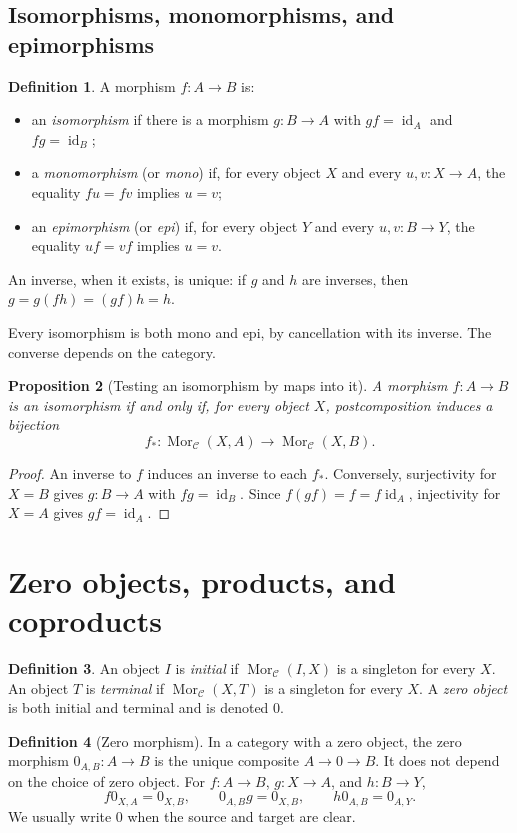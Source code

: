 \documentclass[11pt]{article}
\theoremstyle{definition}
\newtheorem{definition}{Definition}[section]
\theoremstyle{plain}
\newtheorem{proposition}[definition]{Proposition}
\newcommand{\C}{\mathcal C}
\newcommand{\Mor}{\operatorname{Mor}}
\newcommand{\id}{\operatorname{id}}
\begin{document}
\subsection*{Isomorphisms, monomorphisms, and epimorphisms}
\begin{definition}
A morphism $f\colon A\to B$ is:
\begin{itemize}
\item an \emph{isomorphism} if there is a morphism $g\colon B\to A$ with $gf=\id_A$ and $fg=\id_B$;
\item a \emph{monomorphism} (or \emph{mono}) if, for every object $X$ and every $u,v\colon X\to A$, the equality $fu=fv$ implies $u=v$;
\item an \emph{epimorphism} (or \emph{epi}) if, for every object $Y$ and every $u,v\colon B\to Y$, the equality $uf=vf$ implies $u=v$.
\end{itemize}
An inverse, when it exists, is unique: if $g$ and $h$ are inverses, then $g=g(fh)=(gf)h=h$.
\end{definition}
Every isomorphism is both mono and epi, by cancellation with its inverse. The converse depends on the category.

\begin{proposition}[Testing an isomorphism by maps into it]
A morphism $f\colon A\to B$ is an isomorphism if and only if, for every object $X$, postcomposition induces a bijection
\[
f_*\colon\Mor_{\C}(X,A)\longrightarrow\Mor_{\C}(X,B).
\]
\end{proposition}
\begin{proof}
An inverse to $f$ induces an inverse to each $f_*$. Conversely, surjectivity for $X=B$ gives $g\colon B\to A$ with $fg=\id_B$. Since $f(gf)=f=f\id_A$, injectivity for $X=A$ gives $gf=\id_A$.
\end{proof}

\section{Zero objects, products, and coproducts}
\begin{definition}
An object $I$ is \emph{initial} if $\Mor_{\C}(I,X)$ is a singleton for every $X$. An object $T$ is \emph{terminal} if $\Mor_{\C}(X,T)$ is a singleton for every $X$. A \emph{zero object} is both initial and terminal and is denoted $0$.
\end{definition}

\begin{definition}[Zero morphism]
In a category with a zero object, the zero morphism $0_{A,B}\colon A\to B$ is the unique composite $A\to0\to B$. It does not depend on the choice of zero object. For $f\colon A\to B$, $g\colon X\to A$, and $h\colon B\to Y$,
\[
f0_{X,A}=0_{X,B},\qquad 0_{A,B}g=0_{X,B},\qquad h0_{A,B}=0_{A,Y}.
\]
We usually write $0$ when the source and target are clear.
\end{definition}
\end{document}
